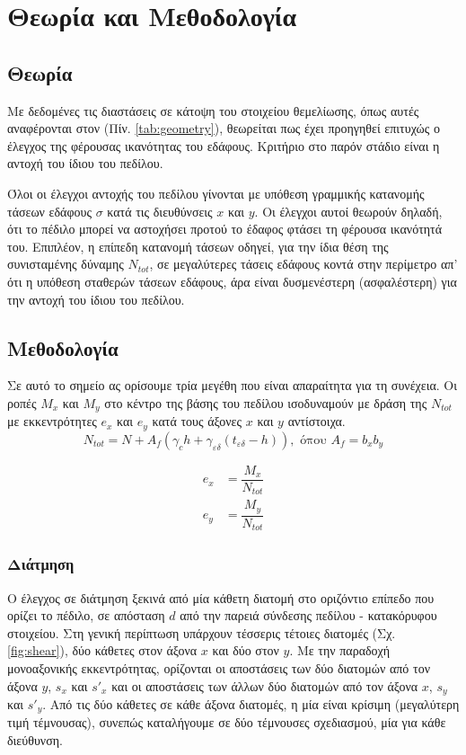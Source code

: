 \pagestyle{fancy}
\chapter{Θεωρία και Μεθοδολογία}
\section{Θεωρία}
Με δεδομένες τις διαστάσεις σε κάτοψη του στοιχείου θεμελίωσης, όπως αυτές αναφέρονται στον (Πίν. \ref{tab:geometry}), θεωρείται πως έχει προηγηθεί επιτυχώς ο έλεγχος της φέρουσας ικανότητας του εδάφους. Κριτήριο στο παρόν στάδιο είναι η αντοχή του ίδιου του πεδίλου.

Όλοι οι έλεγχοι αντοχής του πεδίλου γίνονται με υπόθεση γραμμικής κατανομής τάσεων εδάφους ${\sigma}$ κατά τις διευθύνσεις $x$ και $y$. Οι έλεγχοι αυτοί θεωρούν δηλαδή, ότι το πέδιλο μπορεί να αστοχήσει προτού το έδαφος φτάσει τη φέρουσα ικανότητά του. Επιπλέον, η επίπεδη κατανομή τάσεων οδηγεί, για την ίδια θέση της συνισταμένης δύναμης $N_{tot}$, σε μεγαλύτερες τάσεις εδάφους κοντά στην περίμετρο απ' ότι η υπόθεση σταθερών τάσεων εδάφους, άρα είναι δυσμενέστερη (ασφαλέστερη) για την αντοχή του ίδιου του πεδίλου.

\section{Μεθοδολογία}
Σε αυτό το σημείο ας ορίσουμε τρία μεγέθη που είναι απαραίτητα για τη συνέχεια. Οι ροπές $M_{x}$ και $M_{y}$ στο κέντρο της βάσης του πεδίλου ισοδυναμούν με δράση της $N_{tot}$ με εκκεντρότητες $e_{x}$ και $e_{y}$ κατά τους άξονες $x$ και $y$ αντίστοιχα.
\begin{equation}
  N_{tot} = N + A_f ({\gamma}_c h + {\gamma}_{\varepsilon\delta}(t_{\varepsilon\delta} - h)),\text{ όπου } A_f = b_x b_y
\end{equation}

\begin{subequations}
\begin{align}
  e_{x} & = \dfrac{M_{x}}{N_{tot}} \\[10pt]
  e_{y} & = \dfrac{M_{y}}{N_{tot}}
\end{align}
\end{subequations}

\subsection{Διάτμηση}
Ο έλεγχος σε διάτμηση ξεκινά από μία κάθετη διατομή στο οριζόντιο επίπεδο που ορίζει το πέδιλο, σε απόσταση $d$ από την παρειά σύνδεσης πεδίλου - κατακόρυφου στοιχείου. Στη γενική περίπτωση υπάρχουν τέσσερις τέτοιες διατομές (Σχ. \ref{fig:shear}), δύο κάθετες στον άξονα $x$ και δύο στον $y$. Με την παραδοχή μονοαξονικής εκκεντρότητας, ορίζονται οι αποστάσεις των δύο διατομών από τον άξονα $y$, $s_x$ και $s'_x$ και οι αποστάσεις των άλλων δύο διατομών από τον άξονα $x$, $s_y$ και $s'_y$. Από τις δύο κάθετες σε κάθε άξονα διατομές, η μία είναι κρίσιμη (μεγαλύτερη τιμή τέμνουσας), συνεπώς καταλήγουμε σε δύο τέμνουσες σχεδιασμού, μία για κάθε διεύθυνση.

